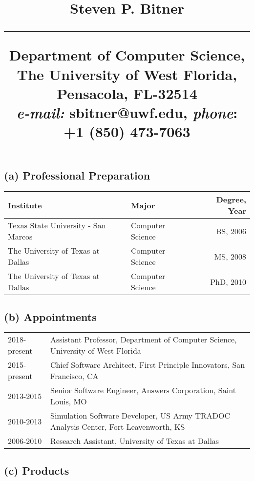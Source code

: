 \documentclass[svgnames,11pt]{article}
\title{%
        \vspace{-2\baselineskip}
            \normalsize
            {\textbf{Steven P. Bitner}}\\
            \vspace{0.5\baselineskip}
            \hrule
            \vspace{0.5\baselineskip}
            Department of Computer Science, The University of West Florida, Pensacola, FL-32514 \\
            \textit{e-mail:} sbitner@uwf.edu,
            \textit{phone}: +1 (850) 473-7063
        \vspace{-1.5ex}
}
\date{}
\begin{document}
\maketitle
\vspace{-4\baselineskip}
\subsection*{(a) Professional Preparation}
\begin{table}[H]
\centering
\begin{tabular}{llr}
\hline
Institute                                                & Major          & Degree, Year            \\ \hline
Texas State University - San Marcos & Computer Science    & BS, 2006       \\
The University of Texas at Dallas & Computer Science  & MS, 2008       \\
The University of Texas at Dallas & Computer Science  & PhD, 2010       \\
\end{tabular}
\end{table}

\subsection*{(b) Appointments}
\begin{table}[H]
\centering
\begin{tabular}{ll}
2018-present & Assistant Professor, Department of Computer Science, University of West Florida \\
2015-present   & Chief Software Architect, First Principle Innovators, San Francisco, CA \\
2013-2015   & Senior Software Engineer, Answers Corporation, Saint Louis, MO \\
2010-2013   & Simulation Software Developer, US Army TRADOC Analysis Center, Fort Leavenworth, KS \\
2006-2010   & Research Assistant, University of Texas at Dallas
\end{tabular}
\end{table}
\subsection*{(c) Products}

\nocite{DBLP:journals/comgeo/BitnerD12}


\end{document}

